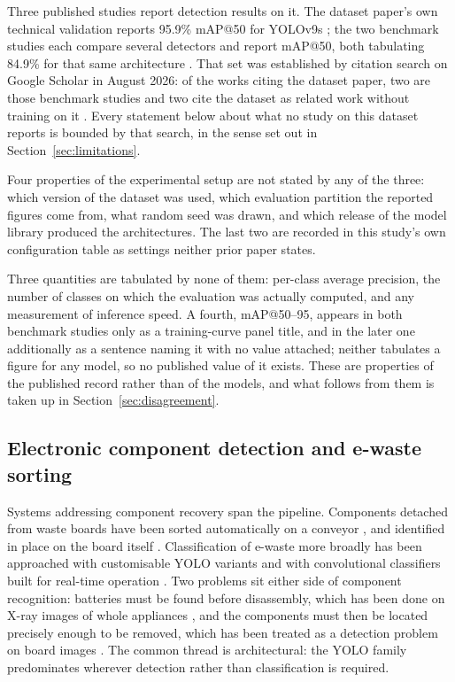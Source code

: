 Three published studies report detection results on it. The dataset paper's own
technical validation reports 95.9\% mAP@50 for YOLOv9s \citep{electrocom61}; the
two benchmark studies each compare several detectors and report mAP@50, both
tabulating 84.9\% for that same architecture
\citep{yolov12paper,yolov13paper}. That set was established by citation search
on Google Scholar in August 2026: of the works citing the dataset paper, two are
those benchmark studies and two cite the dataset as related work without
training on it \citep{nguyen2025iotkits,chen2025augmentation}. Every statement
below about what no study on this dataset reports is bounded by that search, in
the sense set out in Section~\ref{sec:limitations}.

Four properties of the experimental setup are not stated by any of the three:
which version of the dataset was used, which evaluation partition the reported
figures come from, what random seed was drawn, and which release of the model
library produced the architectures. The last two are recorded in this study's
own configuration table as settings neither prior paper states.

Three quantities are tabulated by none of them: per-class average precision, the
number of classes on which the evaluation was actually computed, and any
measurement of inference speed. A fourth, mAP@50--95, appears in both benchmark
studies only as a training-curve panel title, and in the later one additionally
as a sentence naming it with no value attached; neither tabulates a figure for
any model, so no published value of it exists. These are properties of the
published record rather than of the models, and what follows from them is
taken up in Section~\ref{sec:disagreement}.

\subsection{Electronic component detection and e-waste sorting}
\label{sec:related-ewaste}

Systems addressing component recovery span the pipeline. Components detached
from waste boards have been sorted automatically on a conveyor
\citep{lu2022sorting}, and identified in place on the board itself
\citep{sharma2024vision}. Classification
of e-waste more broadly has been approached with customisable YOLO variants
\citep{rajeev2025ewaste} and with convolutional classifiers built for real-time
operation \citep{sarswat2024realtime}. Two problems sit either side of component
recognition: batteries must be found before disassembly, which has been done on
X-ray images of whole appliances \citep{sterkens2021xray}, and the components
must then be located precisely enough to be removed, which has been treated as a
detection problem on board images \citep{puttero2024disassembly}. The common
thread is architectural: the YOLO family predominates wherever detection rather
than classification is required.

